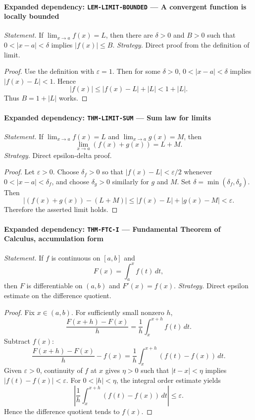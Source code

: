 \documentclass[10pt]{article}
\newcommand{\pidraw}[1]{\begingroup\urlstyle{tt}\nolinkurl{#1}\endgroup}
\theoremstyle{definition}
\theoremstyle{remark}
\begin{document}
\paragraph{Expanded dependency: \pidraw{LEM-LIMIT-BOUNDED} --- A convergent function is locally bounded}
\textit{Statement.} If $\lim_{x\to a}f(x)=L$, then there are $\delta>0$ and $B>0$ such that
$0<|x-a|<\delta$ implies $|f(x)|\le B$.
\textit{Strategy.} Direct proof from the definition of limit.
\begin{proof}Use the definition with $\varepsilon=1$. Then for some $\delta>0$,
$0<|x-a|<\delta$ implies $|f(x)-L|<1$. Hence
\[
|f(x)|\le |f(x)-L|+|L|<1+|L|.
\]
Thus $B=1+|L|$ works.\end{proof}

\paragraph{Expanded dependency: \pidraw{THM-LIMIT-SUM} --- Sum law for limits}
\textit{Statement.} If $\lim_{x\to a}f(x)=L$ and $\lim_{x\to a}g(x)=M$, then
\[
\lim_{x\to a}(f(x)+g(x))=L+M.
\]
\textit{Strategy.} Direct epsilon-delta proof.
\begin{proof}Let $\varepsilon>0$. Choose $\delta_f>0$ so that
$|f(x)-L|<\varepsilon/2$ whenever $0<|x-a|<\delta_f$, and choose
$\delta_g>0$ similarly for $g$ and $M$. Set
$\delta=\min(\delta_f,\delta_g)$. Then
\[
|(f(x)+g(x))-(L+M)|
\le |f(x)-L|+|g(x)-M|<\varepsilon.
\]
Therefore the asserted limit holds.\end{proof}

\paragraph{Expanded dependency: \pidraw{THM-FTC-I} --- Fundamental Theorem of Calculus, accumulation form}
\textit{Statement.} If $f$ is continuous on $[a,b]$ and
\[
F(x)=\int_a^x f(t)\,dt,
\]
then $F$ is differentiable on $(a,b)$ and $F'(x)=f(x)$.
\textit{Strategy.} Direct epsilon estimate on the difference quotient.
\begin{proof}Fix $x\in(a,b)$. For sufficiently small nonzero $h$,
\[
\frac{F(x+h)-F(x)}{h}
=
\frac1h\int_x^{x+h}f(t)\,dt.
\]
Subtract $f(x)$:
\[
\frac{F(x+h)-F(x)}{h}-f(x)
=
\frac1h\int_x^{x+h}(f(t)-f(x))\,dt.
\]
Given $\varepsilon>0$, continuity of $f$ at $x$ gives $\eta>0$ such that
$|t-x|<\eta$ implies $|f(t)-f(x)|<\varepsilon$. For $0<|h|<\eta$, the
integral order estimate yields
\[
\left|
\frac1h\int_x^{x+h}(f(t)-f(x))\,dt
\right|
\le \varepsilon.
\]
Hence the difference quotient tends to $f(x)$.\end{proof}
\end{document}
